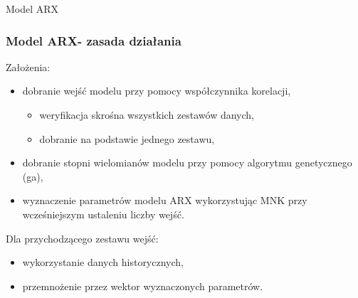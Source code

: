 \begin{frame}[plain,c]
  \begin{center}
    \Huge Model ARX
  \end{center}
\end{frame}

\begin{frame}
  \frametitle{Model ARX- zasada działania}
  \begin{block}{Założenia:}
    \begin{itemize}
      \item dobranie wejść modelu przy pomocy współczynnika korelacji,
        \begin{itemize}
          \item weryfikacja skrośna wszystkich zestawów danych,
          \item dobranie na podstawie jednego zestawu, 
        \end{itemize}
      \item dobranie stopni wielomianów modelu przy pomocy algorytmu genetycznego (ga),
      \item wyznaczenie parametrów modelu ARX wykorzystując MNK przy wcześniejszym ustaleniu liczby wejść.
    \end{itemize}
  \end{block}

  \begin{block}{Dla przychodzącego zestawu wejść:}
    \begin{itemize}
      \item wykorzystanie danych historycznych,
      \item przemnożenie przez wektor wyznaczonych parametrów. 
    \end{itemize}
  \end{block}
\end{frame}

